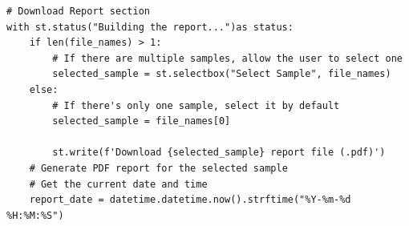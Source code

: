 \begin{longlisting}
\begin{verbatim}
# Download Report section
with st.status("Building the report...")as status:
    if len(file_names) > 1:
        # If there are multiple samples, allow the user to select one
        selected_sample = st.selectbox("Select Sample", file_names)
    else:
        # If there's only one sample, select it by default
        selected_sample = file_names[0]
        
        st.write(f'Download {selected_sample} report file (.pdf)')
    # Generate PDF report for the selected sample
    # Get the current date and time
    report_date = datetime.datetime.now().strftime("%Y-%m-%d %H:%M:%S")
    

\end{verbatim}
\end{longlisting}
